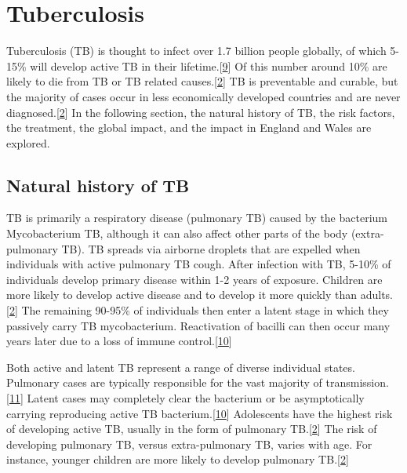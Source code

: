 \documentclass[11pt,twoside]{bristolthesis}
\begin{document}
  \hypertarget{tuberculosis}{%
  \section{Tuberculosis}\label{tuberculosis}}
  
  Tuberculosis (TB) is thought to infect over 1.7 billion people globally, of which 5-15\% will develop active TB in their lifetime.{[}\protect\hyperlink{ref-Houben:2016jp}{9}{]} Of this number around 10\% are likely to die from TB or TB related causes.{[}\protect\hyperlink{ref-TheWorldHealthOrganization:2018va}{2}{]} TB is preventable and curable, but the majority of cases occur in less economically developed countries and are never diagnosed.{[}\protect\hyperlink{ref-TheWorldHealthOrganization:2018va}{2}{]} In the following section, the natural history of TB, the risk factors, the treatment, the global impact, and the impact in England and Wales are explored.
  
  \hypertarget{natural-history-of-tb}{%
  \subsection{Natural history of TB}\label{natural-history-of-tb}}
  
  TB is primarily a respiratory disease (pulmonary TB) caused by the bacterium Mycobacterium TB, although it can also affect other parts of the body (extra-pulmonary TB). TB spreads via airborne droplets that are expelled when individuals with active pulmonary TB cough. After infection with TB, 5-10\% of individuals develop primary disease within 1-2 years of exposure. Children are more likely to develop active disease and to develop it more quickly than adults.{[}\protect\hyperlink{ref-TheWorldHealthOrganization:2018va}{2}{]} The remaining 90-95\% of individuals then enter a latent stage in which they passively carry TB mycobacterium. Reactivation of bacilli can then occur many years later due to a loss of immune control.{[}\protect\hyperlink{ref-Gideon2011a}{10}{]}
  
  Both active and latent TB represent a range of diverse individual states. Pulmonary cases are typically responsible for the vast majority of transmission.{[}\protect\hyperlink{ref-Sepkowitz1996}{11}{]} Latent cases may completely clear the bacterium or be asymptotically carrying reproducing active TB bacterium.{[}\protect\hyperlink{ref-Gideon2011a}{10}{]} Adolescents have the highest risk of developing active TB, usually in the form of pulmonary TB.{[}\protect\hyperlink{ref-TheWorldHealthOrganization:2018va}{2}{]} The risk of developing pulmonary TB, versus extra-pulmonary TB, varies with age. For instance, younger children are more likely to develop pulmonary TB.{[}\protect\hyperlink{ref-TheWorldHealthOrganization:2018va}{2}{]}
  
\end{document}
